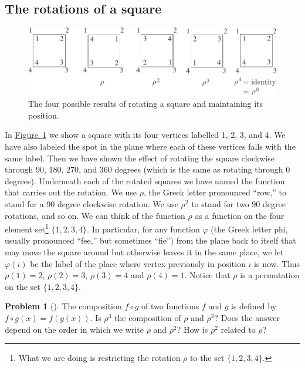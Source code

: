 \documentclass[10pt,]{book}
\theoremstyle{plain}
\theoremstyle{definition}
\newtheorem{activity}[project]{Problem}
\theoremstyle{definition}
\numberwithin{equation}{chapter}
\begin{document}
\subsection[{The rotations of a square}]{The rotations of a square}\label{subsection-58}
\leavevmode%
\begin{figure}
\centering
\includegraphics[width=0.95\linewidth]{images/RotationsOfSquare}
\caption{The four possible results of rotating a square and maintaining its position.\label{RotationsOfSquare}}
\end{figure}
In \hyperref[RotationsOfSquare]{Figure~\ref{RotationsOfSquare}} we show a square with its four vertices labelled 1, 2, 3, and 4. We have also labeled the spot in the plane where each of these vertices falls with the same label. Then we have shown the effect of rotating the square clockwise through 90, 180, 270, and 360 degrees (which is the same as rotating through 0 degrees). Underneath each of the rotated squares we have named the function that carries out the rotation. We use \(\rho\), the Greek letter pronounced ``row,'' to stand for a 90 degree clockwise rotation. We use \(\rho^2\) to stand for two 90 degree rotations, and so on. We can think of the function \(\rho\) as a function on the four element set\footnote{What we are doing is restricting the rotation \(\rho\) to the set \(\{1,2,3,4\}\).\label{fn-19}} \(\{1,2,3,4\}\). In particular, for any function \(\varphi\) (the Greek letter phi, usually pronounced ``fee,'' but sometimes ``fie'') from the plane back to itself that may move the square around but otherwise leaves it in the same place, we let \(\varphi(i)\) be the label of the place where vertex previously in position \(i\) is now. Thus \(\rho(1) =2\), \(\rho(2)=3\), \(\rho(3)=4\) and \(\rho(4) =1\). Notice that \(\rho\) is a permutation on the set \(\{1,2,3,4\}\).%
\begin{activity}[] \label{composition1}
The composition \(f\circ g\) of two functions \(f\) and \(g\) is defined by \(f\circ g(x) = f(g(x))\). Is \(\rho^3\) the composition of \(\rho\) and \(\rho^2\)? Does the answer depend on the order in which we write \(\rho\) and \(\rho^2\)? How is \(\rho^2\) related to \(\rho\)?%
\end{activity}
\end{document}
